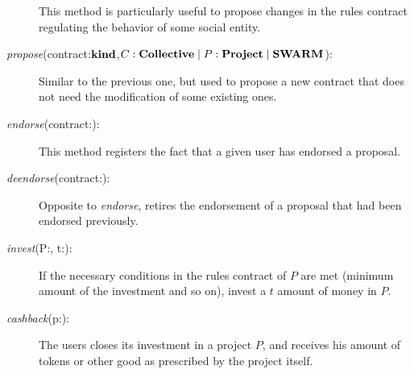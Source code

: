 \documentclass[submission, copyright,creativecommons,sharealike,noncommercial]{eptcs}
\begin{document}
\begin{description}
		This method is particularly useful to propose changes in the rules contract regulating the behavior of some social entity.
		
		\item[\emph{propose}(contract:$\textbf{kind}$,$C:\textbf{Collective} \mid P:\textbf{Project} \mid \textbf{SWARM}$):] Similar to the previous one, but used to propose a new contract that does not need the modification of some existing ones.
		
		\item[\emph{endorse}(contract:\kind):] This method registers the fact that a given user has endorsed a proposal.
		
		\item[\emph{deendorse}(contract:\kind):] Opposite to \emph{endorse}, retires the endorsement of a proposal that had been endorsed previously.
		
		
		\item[\emph{invest}(P:\project, t:\token):] If the necessary conditions in the rules contract of $P$ are met (minimum amount of the investment and so on), invest a $t$ amount of money in $P$. 
		
		\item[\emph{cashback}(p:\project):] The users closes its investment in a project $P$, and receives his amount of tokens or other good as prescribed by the project itself.
	\end{description}
	
	
\end{document}
